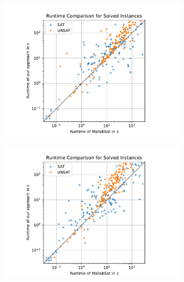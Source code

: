 \documentclass[12pt,a4paper,twoside]{scrartcl}
\numberwithin{equation}{section}
\begin{document}
\begin{figure}
  \center
  \begin{subfigure}[c]{.45\textwidth}
    \center
    \includegraphics[scale=.45]{plots/square_runtime_compare/square_runtime_1node.pdf}
    \label{fig:runtimeCompare1node}
  \end{subfigure}
  \begin{subfigure}[c]{.45\textwidth}
    \center
    \includegraphics[scale=.45]{plots/square_runtime_compare/square_runtime_4node.pdf}
    \label{fig:runtimeCompare4node}
  \end{subfigure}
  \begin{subfigure}[c]{.45\textwidth}
    \center

\end{subfigure}
\end{figure}
\end{document}
